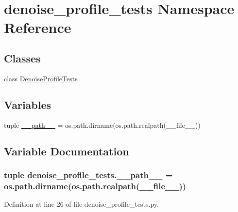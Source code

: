 \hypertarget{namespacedenoise__profile__tests}{\section{denoise\-\_\-profile\-\_\-tests Namespace Reference}
\label{namespacedenoise__profile__tests}
}
\subsection*{Classes}
\begin{DoxyCompactItemize}
\item 
class \hyperlink{classdenoise__profile__tests_1_1DenoiseProfileTests}{Denoise\-Profile\-Tests}
\end{DoxyCompactItemize}
\subsection*{Variables}
\begin{DoxyCompactItemize}
\item 
tuple \hyperlink{namespacedenoise__profile__tests_abe25604e45baef27685344b2ca2ef9d9}{\-\_\-\-\_\-path\-\_\-\-\_\-} = os.\-path.\-dirname(os.\-path.\-realpath(\-\_\-\-\_\-file\-\_\-\-\_\-))
\end{DoxyCompactItemize}


\subsection{Variable Documentation}
\hypertarget{namespacedenoise__profile__tests_abe25604e45baef27685344b2ca2ef9d9}{
\subsubsection[{\-\_\-\-\_\-path\-\_\-\-\_\-}]{\setlength{\rightskip}{0pt plus 5cm}tuple denoise\-\_\-profile\-\_\-tests.\-\_\-\-\_\-path\-\_\-\-\_\- = os.\-path.\-dirname(os.\-path.\-realpath(\-\_\-\-\_\-file\-\_\-\-\_\-))}}\label{namespacedenoise__profile__tests_abe25604e45baef27685344b2ca2ef9d9}


Definition at line 26 of file denoise\-\_\-profile\-\_\-tests.\-py.

